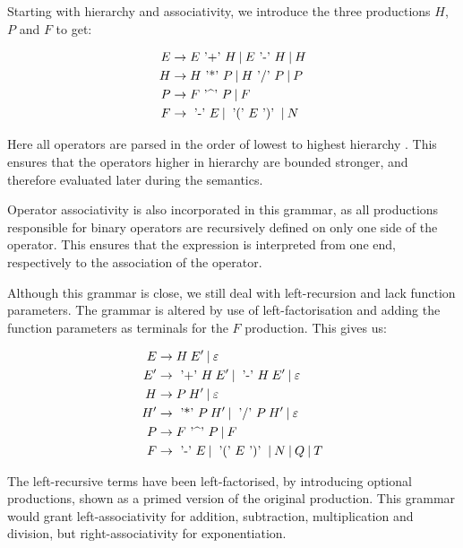 Starting with hierarchy and associativity, we introduce the three productions $H$, $P$ and $F$ to get:

\begin{align*}
E &\rightarrow E \text{ '+' } H \: | \:  E \text{ '-' } H \: | \: H \\
H &\rightarrow H \text{ '*' } P \: | \:  H \text{ '/' } P \: | \: P \\
P &\rightarrow F \text{ '\textasciicircum' } P \: | \:  F \\
F &\rightarrow \text{ '-' } E \: | \: \text{ '(' } E \text{ ')' } \: | \: N
\end{align*}

Here all operators are parsed in the order of lowest to highest hierarchy . This ensures that the operators higher in hierarchy are bounded stronger, and therefore evaluated later during the semantics. 

Operator associativity is also incorporated in this grammar, as all productions responsible for binary operators are recursively defined on only one side of the operator. This ensures that the expression is interpreted from one end, respectively to the association of the operator.

Although this grammar is close, we still deal with left-recursion and lack function parameters. The grammar is altered by use of left-factorisation and adding the function parameters as terminals for the $F$ production. This gives us:

\begin{align*}
E &\rightarrow H \: E' \: | \: \varepsilon \\
E' &\rightarrow \text{ '+' } H \: E' \: | \:  \text{ '-' } H \: E' \: | \: \varepsilon \\
H &\rightarrow P \: H' \: | \: \varepsilon \\
H' &\rightarrow \text{ '*' } P \: H' \: | \: \text{ '/' } P \: H' \: | \: \varepsilon \\
P &\rightarrow F \text{ '\textasciicircum' } P \: | \:  F \\
F &\rightarrow \text{ '-' } E \: | \: \text{ '(' } E \text{ ')' } \: | \: N \: | \: Q \: | \: T
\end{align*}

The left-recursive terms have been left-factorised, by introducing optional productions, shown as a primed version of the original production. This grammar would grant left-associativity for addition, subtraction, multiplication and division, but right-associativity for exponentiation. 

